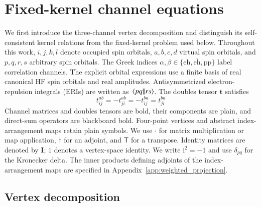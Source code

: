 \documentclass[aip,jcp,reprint,noshowkeys,superscriptaddress]{revtex4-1}
\newcommand{\eh}{\text{eh}}
\newcommand{\teh}{{\overline{\text{eh}}}}
\newcommand{\pp}{\text{pp}}
\newcommand{\ii}{\mathrm{i}}
\newcommand{\bt}{\boldsymbol{t}}
\newcommand{\bI}{\boldsymbol{I}}
\begin{document}
\section{Fixed-kernel channel equations}
\label{sec:parquet}

We first introduce the three-channel vertex decomposition and distinguish
its self-consistent kernel relations from the fixed-kernel problem used
below. Throughout this work, $i,j,k,l$ denote occupied spin orbitals,
$a,b,c,d$ virtual spin orbitals, and $p,q,r,s$ arbitrary spin orbitals.
The Greek indices $\alpha,\beta\in\{\eh,\teh,\pp\}$ label correlation
channels. The explicit orbital expressions use a finite basis of real
canonical HF spin orbitals and real amplitudes. Antisymmetrized
electron-repulsion integrals (ERIs) are written as $\mel{pq}{}{rs}$. The doubles tensor $\bt$ satisfies
\begin{equation}
 t_{ij}^{ab}=-t_{ji}^{ab}=-t_{ij}^{ba}=t_{ji}^{ba}
 \label{eq:t_antisymmetry}
\end{equation}
Channel matrices and doubles tensors are bold, their components are plain,
and direct-sum operators are blackboard bold. Four-point vertices and
abstract index-arrangement maps retain plain symbols. We use $\cdot$ for
matrix multiplication or map application, $\dagger$ for an adjoint, and
$\mathsf T$ for a transpose. Identity matrices are denoted by
$\bI$; $1$ denotes a vertex-space identity. We write $\ii^2=-1$ and use
$\delta_{pq}$ for the
Kronecker delta. The inner products defining adjoints of the
index-arrangement maps are specified in Appendix~\ref{app:weighted_projection}.

\subsection{Vertex decomposition}
\end{document}
